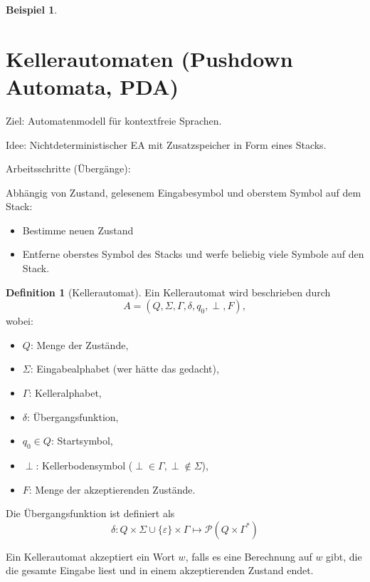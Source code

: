 \documentclass[11pt]{article} %
\theoremstyle{definition}
\newtheorem*{beispiel}{Beispiel}
\newtheorem{definition}{Definition}
\begin{document}
\begin{beispiel}
\begin{enumerate}
\end{enumerate}
\end{beispiel}

\section{Kellerautomaten (Pushdown Automata, PDA)}

Ziel: Automatenmodell für kontextfreie Sprachen.

Idee: Nichtdeterministischer EA mit Zusatzspeicher in Form eines Stacks.

Arbeitsschritte (Übergänge):

Abhängig von Zustand, gelesenem Eingabesymbol und oberstem Symbol auf dem Stack:
\begin{itemize}
\item Bestimme neuen Zustand
\item Entferne oberstes Symbol des Stacks und werfe beliebig viele Symbole auf den Stack.
\end{itemize}

\begin{definition}[Kellerautomat]
Ein Kellerautomat wird beschrieben durch
\[
A = (Q, \Sigma, \Gamma, \delta, q_0, \perp, F),
\]
wobei:
\begin{itemize}
\item $Q$: Menge der Zustände,
\item $\Sigma$: Eingabealphabet (wer hätte das gedacht),
\item $\Gamma$: Kelleralphabet,
\item $\delta$: Übergangsfunktion,
\item $q_0 \in Q$: Startsymbol,
\item $\perp$: Kellerbodensymbol ($\perp \in \Gamma, \perp \notin \Sigma$),
\item $F$: Menge der akzeptierenden Zustände.
\end{itemize}

Die Übergangsfunktion ist definiert als
\[
\delta: Q\times \Sigma \cup \{\varepsilon\}\times \Gamma \mapsto \mathcal{P}(Q\times \Gamma^*)
\]

Ein Kellerautomat akzeptiert ein Wort $w$, falls es eine Berechnung auf $w$ gibt, die die gesamte Eingabe liest und in einem akzeptierenden Zustand endet.

\end{definition}
\end{document}
